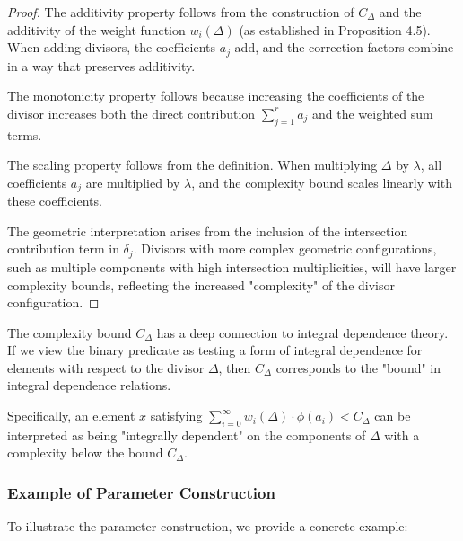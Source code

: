 \begin{proof}
The additivity property follows from the construction of $C_\Delta$ and the additivity of the weight function $w_i(\Delta)$ (as established in Proposition 4.5). When adding divisors, the coefficients $a_j$ add, and the correction factors combine in a way that preserves additivity.

The monotonicity property follows because increasing the coefficients of the divisor increases both the direct contribution $\sum_{j=1}^{r} a_j$ and the weighted sum terms.

The scaling property follows from the definition. When multiplying $\Delta$ by $\lambda$, all coefficients $a_j$ are multiplied by $\lambda$, and the complexity bound scales linearly with these coefficients.

The geometric interpretation arises from the inclusion of the intersection contribution term in $\delta_j$. Divisors with more complex geometric configurations, such as multiple components with high intersection multiplicities, will have larger complexity bounds, reflecting the increased "complexity" of the divisor configuration.
\end{proof}

\begin{remark}
The complexity bound $C_\Delta$ has a deep connection to integral dependence theory. If we view the binary predicate as testing a form of integral dependence for elements with respect to the divisor $\Delta$, then $C_\Delta$ corresponds to the "bound" in integral dependence relations.

Specifically, an element $x$ satisfying $\sum_{i=0}^{\infty} w_i(\Delta) \cdot \phi(a_i) < C_\Delta$ can be interpreted as being "integrally dependent" on the components of $\Delta$ with a complexity below the bound $C_\Delta$.
\end{remark}

\subsubsection{Example of Parameter Construction}

To illustrate the parameter construction, we provide a concrete example:


